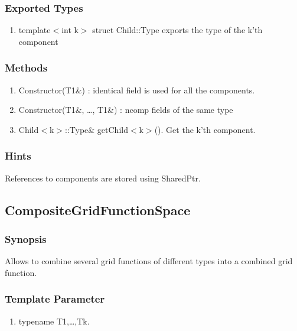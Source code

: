 \documentclass[11pt,a4paper,DIV11,%
notitlepage,oneside,abstracton,%
bibtotoc]{scrartcl}
\begin{document}
\subsubsection{Exported Types}

\begin{enumerate}[1)]
\item template$<$int k$>$ struct Child::Type exports the type of
  the k'th component
\end{enumerate}

\subsubsection{Methods}

\begin{enumerate}[1)]
\item Constructor(T1\&) : identical field is used for all the components. 
\item Constructor(T1\&, \ldots , T1\&) : ncomp fields of the same type
\item Child$<$k$>$::Type\& getChild$<$k$>$(). Get the k'th component.
\end{enumerate}

\subsubsection{Hints}

References to components are stored using SharedPtr.

\subsection{CompositeGridFunctionSpace}

\subsubsection{Synopsis}

Allows to combine several grid functions of different types into a
combined grid function.

\subsubsection{Template Parameter}

\begin{enumerate}[1)]
\item typename T1,\ldots,Tk.
\end{enumerate}
\end{document}

